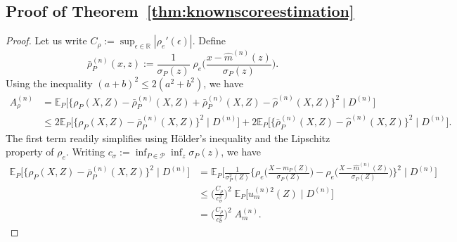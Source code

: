 \documentclass[aos]{imsart}
\newcommand{\R}{\mathbb{R}}
\newcommand{\E}{\mathbb{E}}
\begin{document}
	\subsection{Proof of Theorem~\ref{thm:knownscoreestimation}}
	\begin{proof}
		Let us write $C_\rho := \sup_{\epsilon \in \R} |\rho_{e}'(\epsilon)|$.
		Define \begin{equation*}
			\bar \rho^{(n)}_P (x,z) := \frac{1}{\sigma_P(z)}\; \rho_{e}\bigg(\frac{x-\hat m^{(n)}(z)}{\sigma_P(z)}\bigg).
		\end{equation*}
		Using the inequality $(a+b)^2\leq 2(a^2+b^2)$, we have
		\begin{align*}
			A_\rho^{(n)} &= \E_P\Big[\big\{\rho_P(X,Z)-\bar \rho ^{(n)}_P(X,Z) + \bar \rho ^{(n)}_P(X,Z) - \hat\rho^{(n)}(X,Z)\big\}^2 \;\Big|\; D^{(n)}\Big]\\
			&\leq 2 \E_P\Big[\big\{ \rho_P(X,Z)-\bar \rho ^{(n)}_P(X,Z)\big\}^2 \;\Big|\; D^{(n)}\Big] + 2 \E_P\Big[\big\{\bar \rho ^{(n)}_P(X,Z)-\hat\rho^{(n)}(X,Z)\big\}^2 \;\Big|\; D^{(n)}\Big].
		\end{align*}
		The first term readily simplifies using H\"older's inequality and the Lipschitz property of $\rho_{e}$. Writing $c_{\sigma} := \inf_{P \in \mathcal{P}} \inf_z \sigma_P(z)$, we have 
		\begin{align*}
			\E_P\Big[\big\{\rho_P(X,Z)-\bar \rho ^{(n)}_P(X,Z)\big\}^2 \;\Big|\; D^{(n)}\Big] & = \E_P\Bigg[\frac{1}{\sigma_P^2(Z)}\bigg\{\rho_{e}\bigg(\frac{X-m_P(Z)}{\sigma_P(Z)}\bigg) - \rho_{e}\bigg(\frac{X-\hat m^{(n)}(Z)}{\sigma_P(Z)}\bigg)\bigg\}^2 \;\Bigg|\; D^{(n)}\Bigg]\\
			&\leq \bigg(\frac{C_{\rho}}{c_{\sigma}^2}\bigg)^2 \; \E_P\big[ u_m^{(n)2}(Z) \;\big|\; D^{(n)}\big]\\
			&= \bigg(\frac{C_{\rho}}{c_{\sigma}^2}\bigg)^2 \; A_m^{(n)}.
		\end{align*}


\end{proof}
\end{document}
